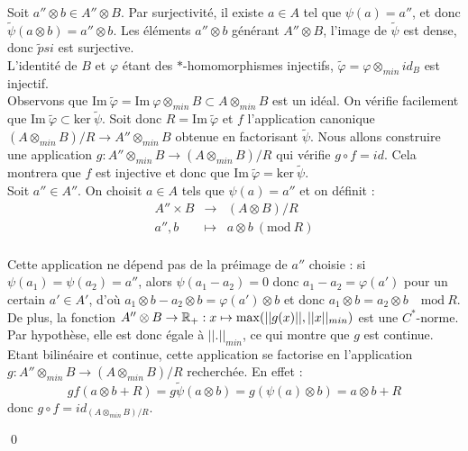 \begin{dem}
Soit $a''\otimes b \in A''\otimes B$. Par surjectivité, il existe $a\in A$ tel que $\psi(a)=a''$, et donc $\tilde\psi(a\otimes b ) = a''\otimes b$. Les éléments $a''\otimes b$ générant $A''\otimes B$, l'image de $\tilde \psi$ est dense, donc $\tilde psi$ est surjective.\\

L'identité de $B$ et $\varphi$ étant des $*$-homomorphismes injectifs, $\tilde\varphi = \varphi \otimes_{min}id_B$ est injectif.\\

Observons que $\text{Im} \ \tilde\varphi =\text{Im}\ \varphi \otimes_{min} B\subset A\otimes_{min} B$ est un idéal.  On vérifie facilement que $\text{Im} \ \tilde\varphi \subset \text{ker}\ \tilde \psi $. Soit donc $R=\text{Im} \ \tilde\varphi$ et $f$ l'application canonique $(A\otimes_{min} B)/ R \rightarrow A''\otimes_{min} B$ obtenue en factorisant $\tilde \psi$. Nous allons construire une application $g : A''\otimes_{min} B \rightarrow (A\otimes_{min} B)/ R $ qui vérifie $g\circ f = id $. Cela montrera que $f$ est injective et donc que $\text{Im} \ \tilde\varphi = \text{ker}\ \tilde \psi $.\\

Soit $a''\in A''$. On choisit $a\in A$ tels que $\psi(a)=a''$ et on définit : 
\[\begin{array}{rcl}
A''\times B & \rightarrow & (A\otimes B) /R \\
a'', b          & \mapsto     & a\otimes b \ (\text{mod} \ R)\\
\end{array}\] 

Cette application ne dépend pas de la préimage de $a''$ choisie : si $\psi(a_1)=\psi(a_2)=a''$, alors $\psi(a_1-a_2)=0$ donc $a_1-a_2=\varphi(a')$ pour un certain $a'\in A'$, d'où $a_1\otimes b -a_2\otimes b = \varphi(a')\otimes b$ et donc $a_1\otimes b = a_2\otimes b \quad \text{mod}\ R$.\\
De plus, la fonction $A''\otimes B\rightarrow \mathbb R_+ :  x\mapsto \max (||g(x)||, ||x||_{min})$ est une $C^*$-norme. Par hypothèse, elle est donc égale à $||.||_{min}$, ce qui montre que $g$ est continue.
Etant bilinéaire et continue, cette application se factorise en l'application $g : A''\otimes_{min} B \rightarrow (A\otimes_{min} B) /R$ recherchée. En effet :
\[gf(a\otimes b + R )= g\tilde\psi(a\otimes b)= g(\psi(a)\otimes b)=a\otimes b +R\]
donc $g\circ f = id_{(A\otimes_{min} B)/R}$.

\qed
\end{dem}

